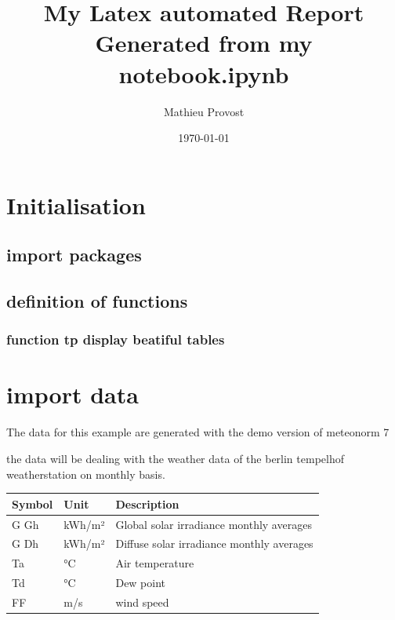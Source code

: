 \documentclass[reprint, floatfix, groupaddress, prb]{article}
\title{\huge{\textbf{My Latex automated Report}}\\[2ex]  \LARGE{Generated from my notebook.ipynb}}
\author{Mathieu Provost}
\date{\today}
\begin{document}
    
    
    
\maketitle

\newpage

\tableofcontents

\newpage

\listoffigures

\newpage

\listoftables

\newpage

    
    

    
    \hypertarget{initialisation}{%
\section{Initialisation}\label{initialisation}}

    \hypertarget{import-packages}{%
\subsection{import packages}\label{import-packages}}

    \hypertarget{definition-of-functions}{%
\subsection{definition of functions}\label{definition-of-functions}}

    \hypertarget{function-tp-display-beatiful-tables}{%
\subsubsection{function tp display beatiful
tables}\label{function-tp-display-beatiful-tables}}

    \hypertarget{import-data}{%
\section{import data}\label{import-data}}

    The data for this example are generated with the demo version of
meteonorm 7

the data will be dealing with the weather data of the berlin tempelhof
weatherstation on monthly basis.

    
        
    \begin{table}[ht] 
\begin{tabular}[l]{lll}
\toprule
Symbol & Unit & Description\\ 
\midrule
G Gh & kWh/m² & Global solar irradiance monthly averages\\ 
G Dh & kWh/m² & Diffuse solar irradiance monthly averages\\ 
Ta & °C & Air temperature\\ 
Td & °C & Dew point\\ 
FF & m/s & wind speed\\ 
\bottomrule 
 \end{tabular}
\end{table}
\end{document}
